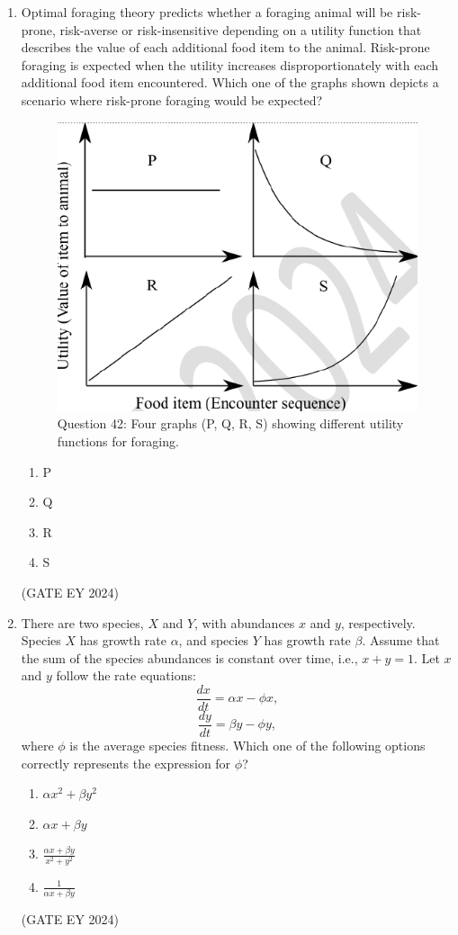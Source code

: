 \documentclass[journal]{IEEEtran}
\begin{document}
\begin{enumerate}
\item Optimal foraging theory predicts whether a foraging animal will be risk-prone, risk-averse or risk-insensitive depending on a utility function that describes the value of each additional food item to the animal. Risk-prone foraging is expected when the utility increases disproportionately with each additional food item encountered. Which one of the graphs shown depicts a scenario where risk-prone foraging would be expected?
\begin{figure}[!ht]
    \centering
    \includegraphics[width=0.3\columnwidth]{figs/Q-42.png}
    \caption{Question 42: Four graphs (P, Q, R, S) showing different utility functions for foraging.}
    \label{Q.42}
\end{figure}
    \begin{multicols}{4}
    \begin{enumerate}
        \item P
        \item Q
        \item R
        \item S
    \end{enumerate}
    \end{multicols}
\hfill{(GATE EY 2024)}

\item There are two species, $X$ and $Y$, with abundances $x$ and $y$, respectively. Species $X$ has growth rate $\alpha$, and species $Y$ has growth rate $\beta$. Assume that the sum of the species abundances is constant over time, i.e., $x + y = 1$. Let $x$ and $y$ follow the rate equations:
$$ \frac{dx}{dt} = \alpha x - \phi x, $$
$$ \frac{dy}{dt} = \beta y - \phi y, $$
where $\phi$ is the average species fitness. Which one of the following options correctly represents the expression for $\phi$?
    \begin{multicols}{2}
    \begin{enumerate}
        \item $\alpha x^2 + \beta y^2$
        \item $\alpha x + \beta y$
        \item $\frac{\alpha x + \beta y}{x^2 + y^2}$
        \item $\frac{1}{\alpha x + \beta y}$
    \end{enumerate}
    \end{multicols}
\hfill{(GATE EY 2024)}


\end{enumerate}
\end{document}
